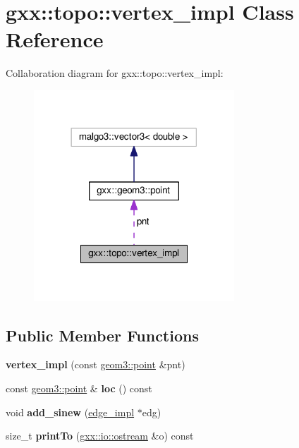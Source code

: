 \hypertarget{classgxx_1_1topo_1_1vertex__impl}{}\section{gxx\+:\+:topo\+:\+:vertex\+\_\+impl Class Reference}
\label{classgxx_1_1topo_1_1vertex__impl}


Collaboration diagram for gxx\+:\+:topo\+:\+:vertex\+\_\+impl\+:
\nopagebreak
\begin{figure}[H]
\begin{center}
\leavevmode
\includegraphics[width=213pt]{classgxx_1_1topo_1_1vertex__impl__coll__graph}
\end{center}
\end{figure}
\subsection*{Public Member Functions}
\begin{DoxyCompactItemize}
\item 
{\bfseries vertex\+\_\+impl} (const \hyperlink{classgxx_1_1geom3_1_1point}{geom3\+::point} \&pnt)\hypertarget{classgxx_1_1topo_1_1vertex__impl_a21b2305b46b7d1dcf018a2dc7ffd120c}{}\label{classgxx_1_1topo_1_1vertex__impl_a21b2305b46b7d1dcf018a2dc7ffd120c}

\item 
const \hyperlink{classgxx_1_1geom3_1_1point}{geom3\+::point} \& {\bfseries loc} () const \hypertarget{classgxx_1_1topo_1_1vertex__impl_a6a59a410b02a6a79b592e56eabf4e9ea}{}\label{classgxx_1_1topo_1_1vertex__impl_a6a59a410b02a6a79b592e56eabf4e9ea}

\item 
void {\bfseries add\+\_\+sinew} (\hyperlink{classgxx_1_1topo_1_1edge__impl}{edge\+\_\+impl} $\ast$edg)\hypertarget{classgxx_1_1topo_1_1vertex__impl_aeccd136a094dfd8cb83ae5f06eac6606}{}\label{classgxx_1_1topo_1_1vertex__impl_aeccd136a094dfd8cb83ae5f06eac6606}

\item 
size\+\_\+t {\bfseries print\+To} (\hyperlink{classgxx_1_1io_1_1ostream}{gxx\+::io\+::ostream} \&o) const \hypertarget{classgxx_1_1topo_1_1vertex__impl_adb9985e2af8b3f3b3405c066faf927f3}{}\label{classgxx_1_1topo_1_1vertex__impl_adb9985e2af8b3f3b3405c066faf927f3}

\end{DoxyCompactItemize}
